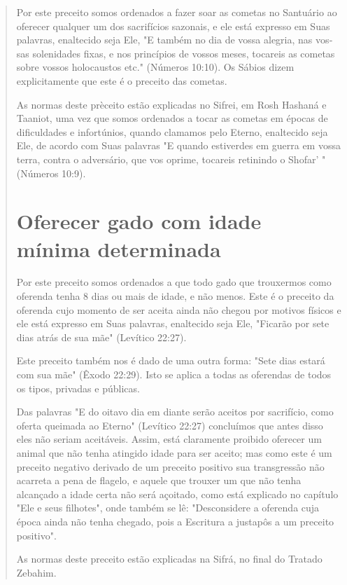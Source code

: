 \begin{quote}
Por este preceito somos ordenados a fazer soar as cometas no San­tuário
ao oferecer qualquer um dos sacrifícios sazonais, e ele está expresso em
Suas palavras, enaltecido seja Ele, "E também no dia de vossa alegria,
nas vos­sas solenidades fixas, e nos princípios de vossos meses,
tocareis as cometas so­bre vossos holocaustos etc." (Números 10:10). Os
Sábios dizem explicitamen­te que este é o preceito das cometas.

As normas deste prèceito estão explicadas no Sifrei, em Rosh Hashaná e
Taaniot, uma vez que somos ordenados a tocar as cometas em épocas de
difi­culdades e infortúnios, quando clamamos pelo Eterno, enaltecido
seja Ele, de acor­do com Suas palavras "E quando estiverdes em guerra em
vossa terra, contra o adversário, que vos oprime, tocareis retinindo o
Shofar' " (Números 10:9).

\section{Oferecer gado com idade mínima determinada}

Por este preceito somos ordenados a que todo gado que trouxer­mos como
oferenda tenha 8 dias ou mais de idade, e não menos. Este é o pre­ceito
da oferenda cujo momento de ser aceita ainda não chegou por motivos
físicos e ele está expresso em Suas palavras, enaltecido seja Ele,
"Ficarão por sete dias atrás de sua mãe" (Levítico 22:27).

Este preceito também nos é dado de uma outra forma: "Sete dias estará
com sua mãe" (Êxodo 22:29). Isto se aplica a todas as oferendas de todos
os tipos, privadas e públicas.

Das palavras "E do oitavo dia em diante serão aceitos por sacrifício,
como oferta queimada ao Eterno" (Levítico 22:27) concluímos que antes
disso eles não seriam aceitáveis. Assim, está claramente proibido
oferecer um animal que não tenha atingido idade para ser aceito; mas
como este é um preceito ne­gativo derivado de um preceito positivo sua
transgressão não acarreta a pena de flagelo, e aquele que trouxer um que
não tenha alcançado a idade certa não será açoitado, como está explicado
no capítulo "Ele e seus filhotes", onde tam­bém se lê: "Desconsidere a
oferenda cuja época ainda não tenha chegado, pois a Escritura a justapôs
a um preceito positivo".

As normas deste preceito estão explicadas na Sifrá, no final do Tra­tado
Zebahim.


\end{quote}
